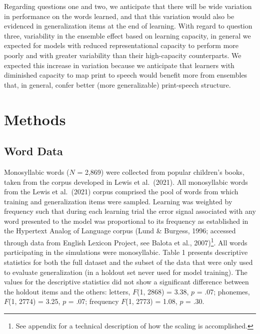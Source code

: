 \documentclass[
  ,man,floatsintext]{apa6}
\begin{document}
Regarding questions one and two, we anticipate that there will be wide variation in performance on the words learned, and that this variation would also be evidenced in generalization items at the end of learning. With regard to question three, variability in the ensemble effect based on learning capacity, in general we expected for models with reduced representational capacity to perform more poorly and with greater variability than their high-capacity counterparts. We expected this increase in variation because we anticipate that learners with diminished capacity to map print to speech would benefit more from ensembles that, in general, confer better (more generalizable) print-speech structure.

\section{Methods}\label{methods}

\subsection{Word Data}\label{word-data}

Monosyllabic words (\(N\) = 2,869) were collected from popular children's books, taken from the corpus developed in Lewis et al.~(2021). All monosyllabic words from the Lewis et al.~(2021) corpus comprised the pool of words from which training and generalization items were sampled. Learning was weighted by frequency such that during each learning trial the error signal associated with any word presented to the model was proportional to its frequency as established in the Hypertext Analog of Language corpus (Lund \& Burgess, 1996; accessed through data from English Lexicon Project, see Balota et al., 2007)\footnote{See appendix for a technical description of how the scaling is accomplished.}. All words participating in the simulations were monosyllabic. Table 1 presents descriptive statistics for both the full dataset and the subset of the data that were only used to evaluate generalization (in a holdout set never used for model training). The values for the descriptive statistics did not show a significant difference between the holdout items and the others: letters, \(F\)(1, 2868) = 3.38, \(p\) = .07; phonemes, \(F\)(1, 2774) = 3.25, \(p\) = .07; frequency \(F\)(1, 2773) = 1.08, \(p\) = .30.
\end{document}
